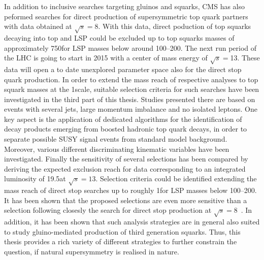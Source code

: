 In addition to inclusive searches targeting gluinos and squarks, CMS has also peformed searches for direct production of supersymmetric top quark partners with data obtained at $\sqrt{s}=8$\tev. With this data, direct poduction of top squarks decaying into top and LSP could be excluded up to top squarks masses of approximately 750\gev for LSP masses below around 100--200\gev. The next run period of the LHC is going to start in 2015 with a center of mass energy of $\sqrt{s}=$13\tev. These data will open a to date unexplored parameter space also for the direct stop quark production. In order to extend the mass reach of respective analyses to top squark masses at the 1\tev scale, suitable selection criteria for such searches have been investigated in the third part of this thesis. Studies presented there are based on events with several jets, large momentum imbalance and no isolated leptons. One key aspect is the application of dedicated algorithms for the identification of decay products emerging from boosted hadronic top quark decays, in order to separate possible SUSY signal events from standard model background. Moreover, various different discriminating kinematic variables have been investigated. Finally the sensitivity of several selections has been compared by deriving the expected exclusion reach for data corresponding to an integrated luminosity of 19.5\fbinv at $\sqrt{s}=13$\tev. Selection criteria could be identified extending the mass reach of direct stop searches up to roughly 1\tev for LSP masses below 100--200\gev. It has been shown that the proposed selections are even more sensitive than a selection following closesly the search for direct stop production at $\sqrt{s} = 8$\tev~\cite{CMS-PAS-SUS-13-015}. In addition, it has been shown that such analysis strategies are in general also suited to study gluino-mediated production of third generation squarks. Thus, this thesis provides a rich variety of different strategies to further constrain the question, if natural supersymmetry is realised in nature. 



